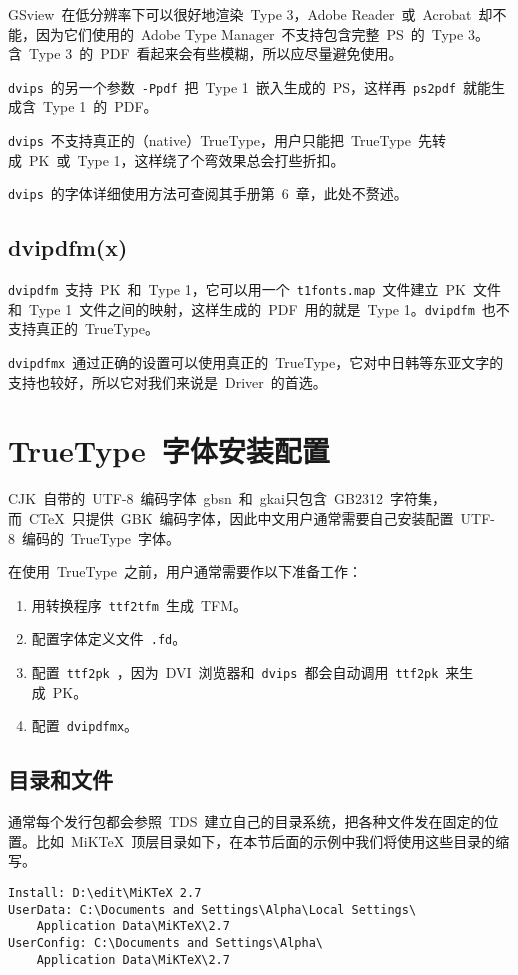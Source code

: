 GSview~在低分辨率下可以很好地渲染~Type 3，Adobe Reader~或~Acrobat~却不能，因为它们使用的~Adobe Type Manager~不支持包含完整~PS~的~Type 3。含~Type 3~的~PDF~看起来会有些模糊，所以应尽量避免使用。

\verb|dvips|~的另一个参数~\verb|-Ppdf|~把~Type 1~嵌入生成的~PS，这样再~\verb|ps2pdf|~就能生成含~Type 1~的~PDF。

\verb|dvips|~不支持真正的（native）TrueType，用户只能把~TrueType~先转成~PK~或~Type 1，这样绕了个弯效果总会打些折扣。

\verb|dvips|~的字体详细使用方法可查阅其手册\cite{Rokicki_2005}第~6~章，此处不赘述。

\subsection{dvipdfm(x)}
\verb|dvipdfm|~支持~PK~和~Type 1，它可以用一个~\verb|t1fonts.map|~文件建立~PK~文件和~Type 1~文件之间的映射，这样生成的~PDF~用的就是~Type 1。\verb|dvipdfm|~也不支持真正的~TrueType。

\verb|dvipdfmx|~通过正确的设置可以使用真正的~TrueType，它对中日韩等东亚文字的支持也较好，所以它对我们来说是~Driver~的首选。

\section{TrueType~字体安装配置}
CJK~自带的~UTF-8~编码字体~gbsn~和~gkai只包含~GB2312~字符集，而~CTeX~只提供~GBK~编码字体，因此中文用户通常需要自己安装配置~UTF-8~编码的~TrueType~字体。

在使用~TrueType~之前，用户通常需要作以下准备工作：
\begin{enumerate}
    \item 用转换程序~\verb|ttf2tfm|~生成~TFM。
    \item 配置字体定义文件~\verb|.fd|。
    \item 配置~\verb|ttf2pk|~，因为~DVI~浏览器和~\verb|dvips|~都会自动调用~\verb|ttf2pk|~来生成~PK。
    \item 配置~\verb|dvipdfmx|。
\end{enumerate}

\subsection{目录和文件}
通常每个发行包都会参照~TDS~建立自己的目录系统，把各种文件发在固定的位置。比如~MiKTeX~顶层目录如下，在本节后面的示例中我们将使用这些目录的缩写。
\begin{lstlisting}
Install: D:\edit\MiKTeX 2.7
UserData: C:\Documents and Settings\Alpha\Local Settings\
    Application Data\MiKTeX\2.7
UserConfig: C:\Documents and Settings\Alpha\
    Application Data\MiKTeX\2.7
\end{lstlisting}

